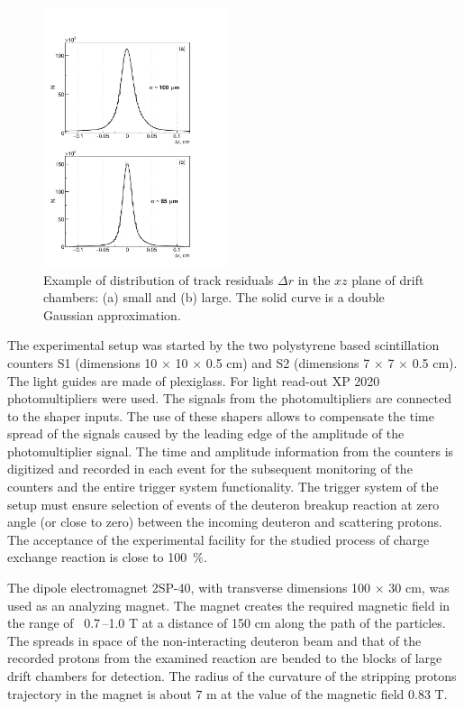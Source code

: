 \documentclass[twocolumn,epjc3]{svjour3}
\begin{document}
\begin{figure}[ht]
  \centering
  \includegraphics[width=0.48\textwidth]{res_chambers.pdf}
  \caption{Example of distribution of track residuals $\Delta r$ in the $xz$
    plane of drift chambers: (a) small and (b) large. The solid curve is a
    double Gaussian approximation.}
  \label{fig:res_chambers}
\end{figure}

The experimental setup was started by the two polysty\-rene based scintillation
counters S1 (dimensions 10 $\times$ 10 $\times$ 0.5 cm) and S2 (dimensions 7
$\times$ 7 $\times$ 0.5 cm). The light guides are made of plexiglass. For light
read-out XP 2020 photomultipliers were used. The signals from the
photomultipliers are connected to the shaper inputs. The use of these shapers
allows to compensate the time spread of the signals caused by the leading edge
of the amplitude of the photomultiplier signal. The time and amplitude
information from the counters is digitized and recorded in each event for the
subsequent monitoring of the counters and the entire trigger system
functionality. The trigger system of the setup must ensure selection of events
of the deuteron breakup reaction at zero angle (or close to zero) between the
incoming deuteron and scattering protons. The acceptance of the experimental
facility for the studied process of charge exchange reaction is close to 100~\%.

The dipole electromagnet 2SP-40, with transverse dimensions 100 $\times$ 30 cm,
was used as an analyzing magnet. The magnet creates the required magnetic field
in the range of \ 0.7\,--1.0 T at a distance of 150 cm along the path of the
particles. The spreads in space of the non-interacting deuteron beam and that of
the recorded protons from the examined reaction are bended to the blocks of
large drift chambers for detection. The radius of the curvature of the stripping
protons trajectory in the magnet is about 7 m at the value of the magnetic field
0.83 T.
\end{document}
